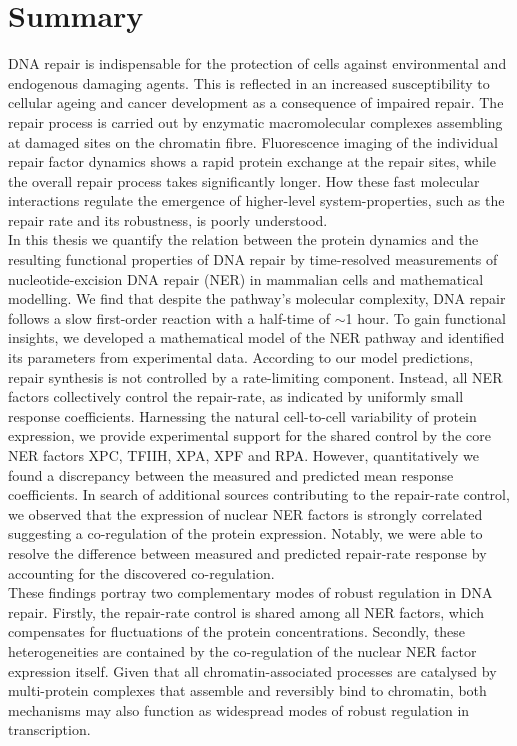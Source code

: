 \chapter*{Summary}
\thispagestyle{plain2}





DNA repair is indispensable for the protection of cells against environmental and endogenous damaging agents. This is reflected in an increased susceptibility to cellular ageing and cancer development as a consequence of impaired repair. The repair process is carried out by enzymatic macromolecular complexes assembling at damaged sites on the chromatin fibre. Fluorescence imaging of the individual repair factor dynamics shows a rapid protein exchange at the repair sites, while the overall repair process takes significantly longer. How these fast molecular interactions regulate the emergence of higher-level system-properties, such as the repair rate and its robustness, is poorly understood.\\ 
In this thesis we quantify the relation between the protein dynamics and the resulting functional properties of DNA repair by time-resolved measurements of nucleotide-excision DNA repair (NER) in mammalian cells and mathematical modelling. We find that despite the pathway's molecular complexity, DNA repair follows a slow first-order reaction with a half-time of $\sim$1 hour. To gain functional insights, we developed a mathematical model of the NER pathway and identified its parameters from experimental data. According to our model predictions, repair synthesis is not controlled by a rate-limiting component. Instead, all NER factors collectively control the repair-rate, as indicated by uniformly small response coefficients. Harnessing the natural cell-to-cell variability of protein expression, we provide experimental support for the shared control by the core NER factors XPC, TFIIH, XPA, XPF and RPA. However, quantitatively we found a discrepancy between the measured and predicted mean response coefficients. In search of additional sources contributing to the repair-rate control, we observed that the expression of nuclear NER factors is strongly correlated suggesting a co-regulation of the protein expression. Notably, we were able to resolve the difference between measured and predicted repair-rate response by accounting for the discovered co-regulation. \\ 
These findings portray two complementary modes of robust regulation in DNA repair. Firstly, the repair-rate control is shared among all NER factors, which compensates for fluctuations of the protein concentrations. Secondly, these heterogeneities are contained by the co-regulation of the nuclear NER factor expression itself. Given that all chromatin-associated processes are catalysed by multi-protein complexes that assemble and reversibly bind to chromatin, both mechanisms may also function as widespread modes of robust regulation in transcription.



      
 


%